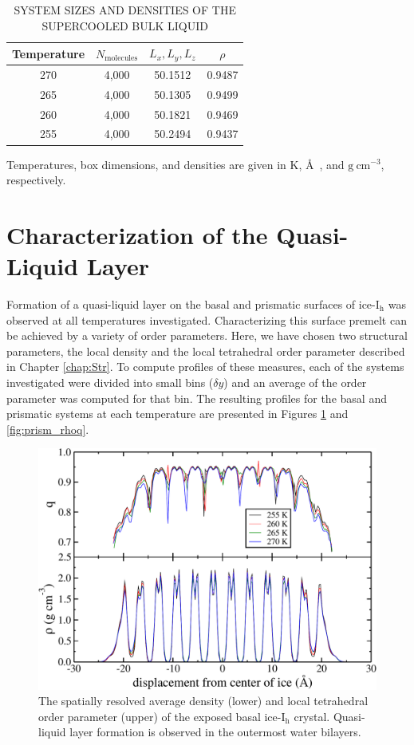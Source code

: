 \begin{table}[h] \centering \caption{SYSTEM SIZES AND DENSITIES OF THE SUPERCOOLED BULK LIQUID\label{tab:qll-liquid}}
\begin{tabular}{cccc}
\hline
\hline
 Temperature & $N_\mathrm{molecules}$ & $L_x, L_y, L_z$ & $\rho$\\
\hline
270 & 4,000 & 50.1512 & 0.9487 \\
265 & 4,000 & 50.1305 & 0.9499 \\
260 & 4,000 & 50.1821 & 0.9469 \\
255 & 4,000 & 50.2494 & 0.9437 \\
\hline
\hline
\end{tabular}
\begin{flushleft}
Temperatures, box dimensions, and densities are given in K, \AA~, and
$\mathrm{g}~\mathrm{cm}^{-3}$, respectively.
\end{flushleft}
\end{table}

\section{Characterization of the Quasi-Liquid Layer}
Formation of a quasi-liquid layer on the basal and prismatic surfaces
of ice-I$_\mathrm{h}$ was observed at all temperatures
investigated. Characterizing this surface premelt can be achieved by a
variety of order parameters. Here, we have chosen two structural
parameters, the local density and the local tetrahedral order
parameter described in Chapter \ref{chap:Str}. To compute profiles of
these measures, each of the systems investigated were divided into
small bins ($\delta y$) and an average of the order parameter was
computed for that bin. The resulting profiles for the basal and
prismatic systems at each temperature are presented in Figures
\ref{fig:basal_rhoq} and \ref{fig:prism_rhoq}.

\begin{figure}
\includegraphics[width=\linewidth]{Figures/basal_rhoq}
\caption{\label{fig:basal_rhoq} The spatially resolved average density
  (lower) and local tetrahedral order parameter (upper) of the
  exposed basal ice-I$_\mathrm{h}$ crystal. Quasi-liquid layer
  formation is observed in the outermost water bilayers.}
\end{figure}                


